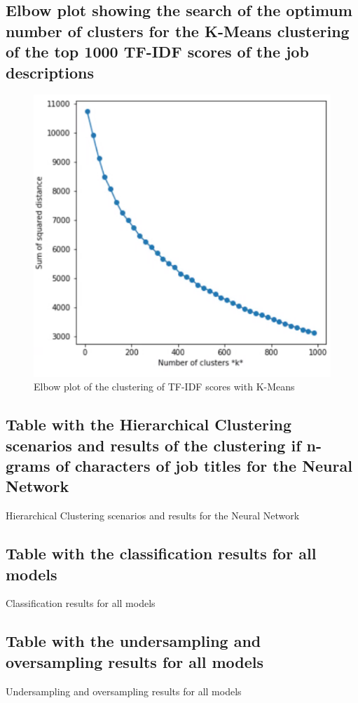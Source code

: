 \subsection{Elbow plot showing the search of the optimum number of clusters for the K-Means clustering of the top 1000 TF-IDF scores of the job descriptions}
\label{ssec:Kmeans}
\begin{figure}[h]
    \centering
    \includegraphics[width=.4\linewidth]{ThesisTemplate/Images/K-means.png}
    \caption{Elbow plot of the clustering of TF-IDF scores with K-Means}
\end{figure}

\subsection{Table with the Hierarchical Clustering scenarios and results of the clustering if n-grams of characters of job titles for the Neural Network}
\label{ssec:hieclu}
\begin{table}[H]
\begin{footnotesize}

\end{footnotesize}
\caption{\label{tab:hieclu} Hierarchical Clustering scenarios and results for the Neural Network}
\end{table}

\subsection{Table with the classification results for all models}
\label{ssec:cm}
\begin{table}[H]
\begin{footnotesize}

\end{footnotesize}
\caption{\label{tab:cm} Classification results for all models}
\end{table}

\subsection{Table with the undersampling and oversampling results for all models}
\label{ssec:ruo}
\begin{table}[H]
\begin{footnotesize}

\end{footnotesize}
\caption{\label{tab:ruo} Undersampling and oversampling results for all models}
\end{table}

